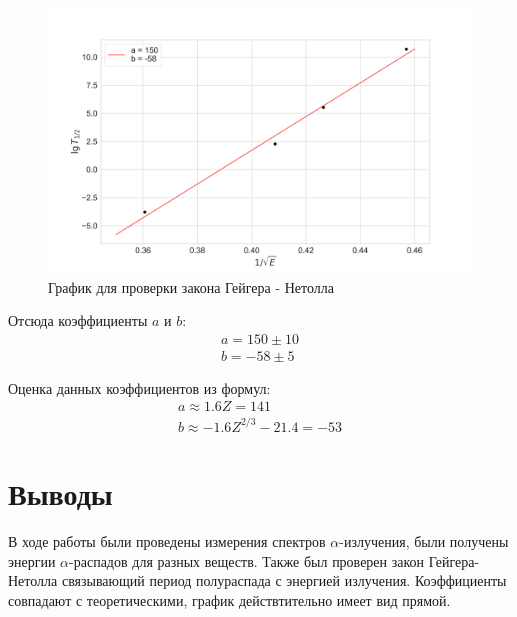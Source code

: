 \documentclass[a4paper, 12pt]{article}
\begin{document}
\begin{figure}[H]
	\centering
	\includegraphics[width=1\textwidth]{plot_geyger.png}  \caption{График для проверки закона Гейгера - Нетолла}
	\label{fig:geyger}
\end{figure}

Отсюда коэффициенты $a$ и $b$:
\begin{align*}
    a = 150 \pm 10\\
    b = -58 \pm 5
\end{align*}

Оценка данных коэффициентов из формул:
\begin{gather*}
    a \approx 1.6Z  = 141 \\
    b \approx -1.6Z^{2/3} - 21.4 = -53
\end{gather*} 

\section{Выводы}
В ходе работы были проведены измерения спектров $\alpha$-излучения, были получены энергии $\alpha$-распадов для разных веществ. Также был проверен закон Гейгера-Нетолла связывающий период полураспада с энергией излучения. Коэффициенты совпадают с теоретическими, график действтительно имеет вид прямой.
\end{document}

